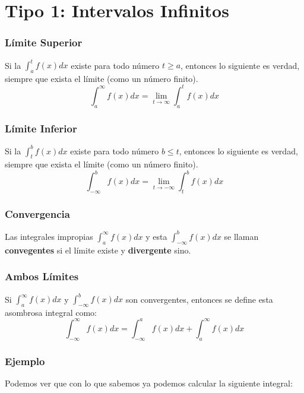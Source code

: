 \documentclass[12pt]{report}                                    %
\begin{document}
    \section{Tipo 1: Intervalos Infinitos}

        \subsubsection{Límite Superior}
        Si la $\int_a^t f(x) dx$ existe para todo número $t \geq a$, entonces
        lo siguiente es verdad, siempre que exista el límite (como un número finito).
        \begin{equation}
            \int_a^{\infty} f(x) dx = \lim_{t \to \infty} \int_a^t f(x) dx
        \end{equation}

        \subsubsection{Límite Inferior}
        Si la $\int_t^b f(x) dx$ existe para todo número $b \leq t$, entonces lo
        siguiente es verdad, siempre que exista el límite (como un número finito).
        \begin{equation}
            \int_{- \infty}^b f(x) dx = \lim_{t \to - \infty} \int_t^b f(x) dx
        \end{equation}

        \subsubsection{Convergencia}
        Las integrales impropias $\int_a^{\infty}f(x)dx$ y esta $\int_{-\infty}^bf(x)dx$
        se llaman \textbf{convegentes} si el límite existe y  \textbf{divergente} sino.

        \subsubsection{Ambos Límites}
        Si $\int_a^{\infty}f(x)dx$ y $\int_{-\infty}^bf(x)dx$ son convergentes, entonces
        se define esta asombrosa integral como:
        \begin{equation}
            \int_{-\infty}^{\infty} f(x) dx = \int_{-\infty}^{a} f(x) dx + \int_{a}^{\infty} f(x) dx   
        \end{equation}

        \subsubsection{Ejemplo}
        Podemos ver que con lo que sabemos ya podemos calcular la siguiente integral:
\end{document}
